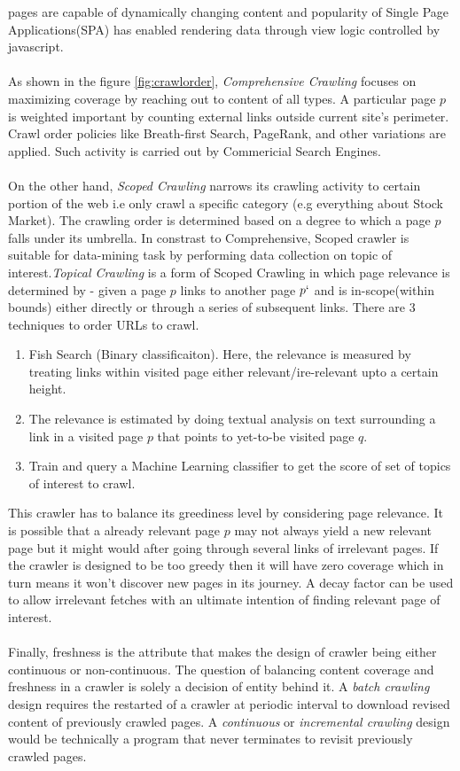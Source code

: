 pages are capable of dynamically changing content and popularity of Single Page Applications(SPA) has
enabled rendering data through view logic controlled by javascript.
\\
\\
 As shown in the figure \ref{fig:crawlorder}, \textit{Comprehensive Crawling} focuses on maximizing coverage by reaching out to content of all types.
A particular page $p$ is weighted important by counting external links outside current site's perimeter. Crawl order policies like Breath-first Search, PageRank, and other variations are applied. Such activity
is carried out by Commericial Search Engines.
\\
\\
On the other hand, \textit{Scoped Crawling} narrows its
crawling activity to certain portion of the web i.e only crawl a specific category (e.g everything about Stock Market). The crawling order is determined based on a degree to which a page $p$ falls under its umbrella.
In constrast to Comprehensive, Scoped crawler is suitable for data-mining task by performing
data collection on topic of interest.\textit{Topical Crawling} is a form of Scoped Crawling in which page relevance is determined by - given a  page $p$ links to another page $p`$ and is in-scope(within bounds) either directly or through a series of subsequent links. There are 3 techniques to order URLs to crawl.

\begin{enumerate}
\item Fish Search (Binary classificaiton). Here, the relevance is measured by treating links within visited
  page either relevant/ire-relevant upto a certain height.
\item The relevance is estimated by doing textual analysis on text surrounding a link in a visited page $p$
  that points to yet-to-be visited page $q$.
\item Train and query a Machine Learning classifier to get the score of set of topics of interest to crawl.
\end{enumerate}

This crawler has to balance its greediness level by considering page relevance. It is possible that a
already relevant page $p$ may not always yield a new relevant page but it might would after going through
several links of irrelevant pages. If the crawler is designed to be too greedy then it will have zero
coverage which in turn means it won't discover new pages in its journey. A decay factor can be used to
allow irrelevant fetches with an ultimate intention of finding relevant page of interest.
\\
\\
Finally, freshness is the attribute that makes the design of crawler being either continuous or non-continuous. The question of balancing content coverage and freshness in a crawler is solely a decision of entity behind it. A \textit{batch crawling} design requires the restarted of a crawler at periodic interval to download revised content of previously crawled pages. A \textit{continuous} or \textit{incremental crawling} design
would be technically a program that never terminates to revisit previously crawled pages.


